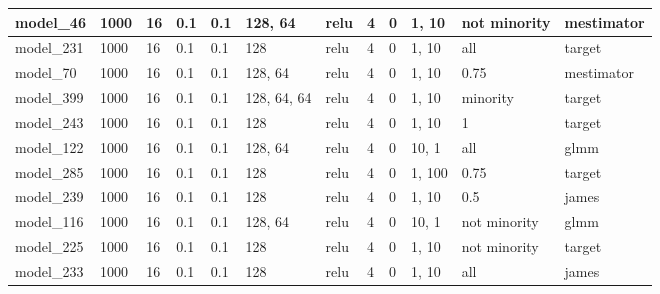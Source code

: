 \begin{tabular}{|l|l|l|l|l|l|l|l|l|l|l|l|}
model\_46      & 1000           & 16           & 0.1          & 0.1          & 128, 64     & relu         & 4           & 0            & 1, 10            & not minority                & mestimator        \\ \hline
model\_231     & 1000           & 16           & 0.1          & 0.1          & 128         & relu         & 4           & 0            & 1, 10            & all                         & target            \\ \hline
model\_70      & 1000           & 16           & 0.1          & 0.1          & 128, 64     & relu         & 4           & 0            & 1, 10            & 0.75                        & mestimator        \\ \hline
model\_399     & 1000           & 16           & 0.1          & 0.1          & 128, 64, 64 & relu         & 4           & 0            & 1, 10            & minority                    & target            \\ \hline
model\_243     & 1000           & 16           & 0.1          & 0.1          & 128         & relu         & 4           & 0            & 1, 10            & 1                           & target            \\ \hline
model\_122     & 1000           & 16           & 0.1          & 0.1          & 128, 64     & relu         & 4           & 0            & 10, 1            & all                         & glmm              \\ \hline
model\_285     & 1000           & 16           & 0.1          & 0.1          & 128         & relu         & 4           & 0            & 1, 100           & 0.75                        & target            \\ \hline
model\_239     & 1000           & 16           & 0.1          & 0.1          & 128         & relu         & 4           & 0            & 1, 10            & 0.5                         & james             \\ \hline
model\_116     & 1000           & 16           & 0.1          & 0.1          & 128, 64     & relu         & 4           & 0            & 10, 1            & not minority                & glmm              \\ \hline
model\_225     & 1000           & 16           & 0.1          & 0.1          & 128         & relu         & 4           & 0            & 1, 10            & not minority                & target            \\ \hline
model\_233     & 1000           & 16           & 0.1          & 0.1          & 128         & relu         & 4           & 0            & 1, 10            & all                         & james             \\ \hline
\end{tabular}